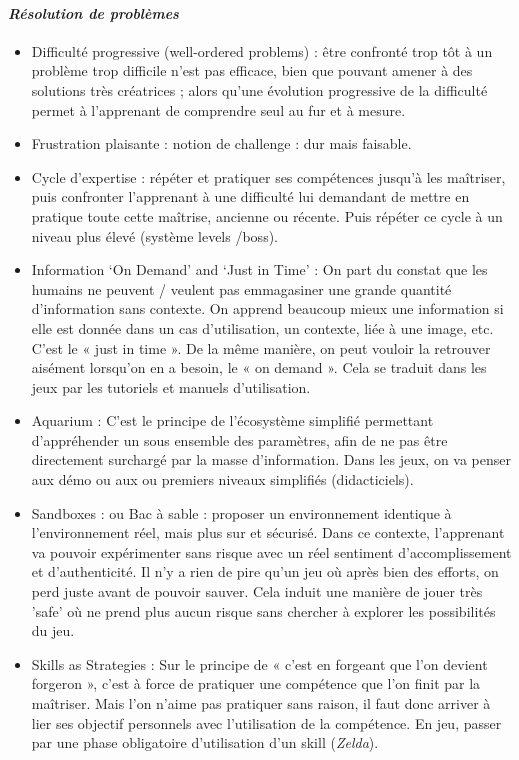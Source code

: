 			\paragraph{\emph{Résolution de problèmes}}
			\begin{itemize}
				\item {Difficulté progressive (well-ordered problems)} : être confronté trop tôt à un problème
trop difficile n'est pas efficace, bien que pouvant amener à des solutions très créatrices ;
alors qu'une évolution progressive de la difficulté permet à l'apprenant de comprendre seul au fur et à mesure.
				\item {Frustration plaisante} : notion de challenge : dur mais faisable.
				\item {Cycle d'expertise} : répéter et pratiquer ses compétences jusqu'à les maîtriser, puis
confronter l'apprenant à une difficulté lui demandant de mettre en pratique toute cette maîtrise, ancienne ou récente. Puis répéter ce cycle à un niveau plus élevé (système levels /boss).
				\item {Information ‘On Demand’ and ‘Just in Time’} :
On part du constat que les humains ne peuvent / veulent pas emmagasiner une grande quantité d'information sans contexte. On apprend beaucoup mieux une information si elle est donnée dans un cas d'utilisation, un contexte, liée à une image, etc. C'est le « just in time ». De la même manière, on peut vouloir la retrouver aisément lorsqu'on en a
besoin, le « on demand ». Cela se traduit dans les jeux par les tutoriels et manuels d'utilisation.
				\item {Aquarium} : C'est le principe de l'écosystème simplifié permettant d'appréhender un sous
ensemble des paramètres, afin de ne pas être directement surchargé par la masse d'information. Dans les jeux, on va penser aux démo ou aux ou premiers niveaux simplifiés (didacticiels).
				\item {Sandboxes : ou Bac à sable} : proposer un environnement identique à l'environnement
réel, mais plus sur et sécurisé. Dans ce contexte, l'apprenant va pouvoir expérimenter sans risque avec un réel sentiment d'accomplissement et d'authenticité. Il n'y a rien de pire qu'un jeu où après bien des efforts, on perd juste avant de pouvoir
sauver. Cela induit une manière de jouer très 'safe' où ne prend plus aucun risque sans chercher à explorer les possibilités du jeu.
				\item {Skills as Strategies} : Sur le principe de « c'est en forgeant que l'on devient forgeron »,
c'est à force de pratiquer une compétence que l'on finit par la maîtriser. Mais l'on n'aime pas pratiquer sans raison, il faut donc arriver à lier ses objectif personnels avec l'utilisation de la compétence. En jeu, passer par une phase obligatoire d'utilisation d'un skill (\emph{Zelda}).
		\end{itemize}
